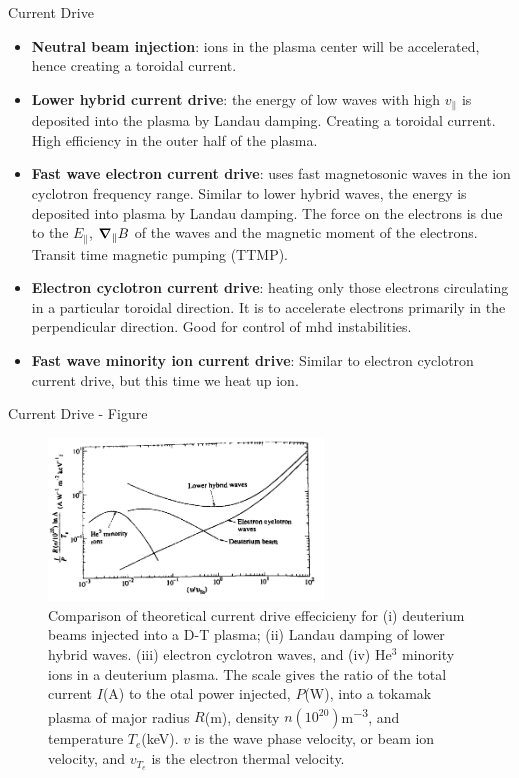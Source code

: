 \begin{frame} {Current Drive}
    \begin{itemize}
        \item \textbf{Neutral beam injection}: ions in the plasma center will be accelerated, hence creating a toroidal current.
        \item \textbf{Lower hybrid current drive}: the energy of low waves with high $v_\parallel$ is deposited into the plasma by Landau damping. Creating a toroidal current. High efficiency in the outer half of the plasma.
        \item \textbf{Fast wave electron current drive}: uses fast magnetosonic waves in the ion cyclotron frequency range. Similar to lower hybrid waves, the energy is deposited into plasma by Landau damping. The force on the electrons is due to the $E_\parallel$, $\grad_\parallel B$ of the waves and the magnetic moment of the electrons. Transit time magnetic pumping (TTMP).
        \item \textbf{Electron cyclotron current drive}: heating only those electrons circulating in a particular toroidal direction. It is to accelerate electrons primarily in the perpendicular direction. Good for control of mhd instabilities.
        \item \textbf{Fast wave minority ion current drive}: Similar to electron cyclotron current drive, but this time we heat up ion.
    \end{itemize}
\end{frame}

\begin{frame}{Current Drive - Figure}
    \begin{figure}
        \centering
        \includegraphics[width=0.65\textwidth]{figures/current-drive.png}
        \caption{Comparison of theoretical current drive effecicieny for (i) deuterium beams injected into a D-T plasma; (ii) Landau damping of lower hybrid waves. (iii) electron cyclotron waves, and (iv) He$^3$ minority ions in a deuterium plasma. The scale gives the ratio of the total current $I$(\unit{\A}) to the otal power injected, $P$(\unit{\W}), into a tokamak plasma of major radius $R$(\unit{\m}), density $n(10^{20})$\unit{\m\tothe{-3}}, and temperature $T_e$(\unit{\kilo\eV}). $v$ is the wave phase velocity, or beam ion velocity, and $v_{T_e}$ is the electron thermal velocity.}
        \label{fig:}
    \end{figure}
\end{frame}